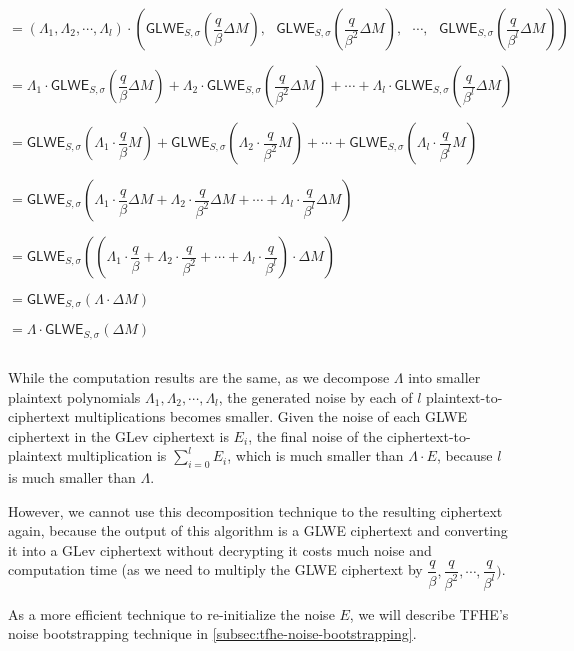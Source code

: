 $= (\Lambda_1, \Lambda_2, \cdots, \Lambda_l) \cdot \left (\textsf{GLWE}_{S, \sigma}\left(\dfrac{q}{\beta} \Delta M\right), \text{ } \textsf{GLWE}_{S, \sigma}\left(\dfrac{q}{\beta^2} \Delta M\right), \text{ } \cdots, \text{ } \textsf{GLWE}_{S, \sigma}\left(\dfrac{q}{\beta^l} \Delta M\right) \right )$

$= \Lambda_1\cdot\textsf{GLWE}_{S, \sigma}\left(\dfrac{q}{\beta} \Delta M\right) +  \Lambda_2\cdot\textsf{GLWE}_{S, \sigma}\left(\dfrac{q}{\beta^2} \Delta M\right) + \cdots + \Lambda_l\cdot\textsf{GLWE}_{S, \sigma}\left(\dfrac{q}{\beta^l} \Delta M\right)$

$= \textsf{GLWE}_{S, \sigma}\left(\Lambda_1\cdot\dfrac{q}{\beta} M\right) +\textsf{GLWE}_{S, \sigma}\left(\Lambda_2\cdot\dfrac{q}{\beta^2} M\right)+ \cdots + \textsf{GLWE}_{S, \sigma}\left(\Lambda_l\cdot\dfrac{q}{\beta^l} M\right)$

$= \textsf{GLWE}_{S, \sigma}\left(\Lambda_1\cdot\dfrac{q}{\beta} \Delta M + \Lambda_2\cdot\dfrac{q}{\beta^2} \Delta M + \cdots + \Lambda_l\cdot\dfrac{q}{\beta^l} \Delta M\right)$

$= \textsf{GLWE}_{S, \sigma}\left(\left(\Lambda_1\cdot\dfrac{q}{\beta} + \Lambda_2\cdot\dfrac{q}{\beta^2} + \cdots + \Lambda_l\cdot\dfrac{q}{\beta^l}\right)\cdot \Delta M\right)$

$= \textsf{GLWE}_{S, \sigma}\left(\Lambda \cdot \Delta M\right)$

$= \Lambda \cdot \textsf{GLWE}_{S, \sigma}( \Delta M)$

$ $

While the computation results are the same, as we decompose $\Lambda$ into smaller plaintext polynomials $\Lambda_1, \Lambda_2, \cdots, \Lambda_l$, the generated noise by each of $l$ plaintext-to-ciphertext multiplications becomes smaller.  Given the noise of each GLWE ciphertext in the GLev ciphertext is $E_i$, the final noise of the ciphertext-to-plaintext multiplication is $\sum\limits_{i=0}^{l}E_i$, which is much smaller than $\Lambda \cdot E$, because $l$ is much smaller than $\Lambda$. 

However, we cannot use this decomposition technique to the resulting ciphertext again, because the output of this algorithm is a GLWE ciphertext and converting it into a GLev ciphertext without decrypting it costs much noise and computation time (as we need to multiply the GLWE ciphertext by $\dfrac{q}{\beta}, \dfrac{q}{\beta^2}, \cdots, \dfrac{q}{\beta^l})$.  

As a more efficient technique to re-initialize the noise $E$, we will describe TFHE's noise bootstrapping technique in \autoref{subsec:tfhe-noise-bootstrapping}.
